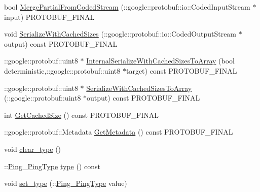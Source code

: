 \begin{DoxyCompactItemize}
\item 
bool \hyperlink{class_ping_acd787a5f6a08da73732ab836a45a6e37}{Merge\+Partial\+From\+Coded\+Stream} (\+::google\+::protobuf\+::io\+::\+Coded\+Input\+Stream $\ast$input) P\+R\+O\+T\+O\+B\+U\+F\+\_\+\+F\+I\+N\+AL
\item 
void \hyperlink{class_ping_a17ce4500b68684b5559d64582f85ac83}{Serialize\+With\+Cached\+Sizes} (\+::google\+::protobuf\+::io\+::\+Coded\+Output\+Stream $\ast$output) const P\+R\+O\+T\+O\+B\+U\+F\+\_\+\+F\+I\+N\+AL
\item 
\+::google\+::protobuf\+::uint8 $\ast$ \hyperlink{class_ping_afaaa02e1530f7932d9dde670d91522a0}{Internal\+Serialize\+With\+Cached\+Sizes\+To\+Array} (bool deterministic,\+::google\+::protobuf\+::uint8 $\ast$target) const P\+R\+O\+T\+O\+B\+U\+F\+\_\+\+F\+I\+N\+AL
\item 
\+::google\+::protobuf\+::uint8 $\ast$ \hyperlink{class_ping_acc6a8786d5c49bd6b7bee07576eb3221}{Serialize\+With\+Cached\+Sizes\+To\+Array} (\+::google\+::protobuf\+::uint8 $\ast$output) const P\+R\+O\+T\+O\+B\+U\+F\+\_\+\+F\+I\+N\+AL
\item 
int \hyperlink{class_ping_ad03f141e652e948c624e7cbddad2a192}{Get\+Cached\+Size} () const P\+R\+O\+T\+O\+B\+U\+F\+\_\+\+F\+I\+N\+AL
\item 
\+::google\+::protobuf\+::\+Metadata \hyperlink{class_ping_a36cbd90f664fba2f065c1ef35b03a8b4}{Get\+Metadata} () const P\+R\+O\+T\+O\+B\+U\+F\+\_\+\+F\+I\+N\+AL
\item 
void \hyperlink{class_ping_ae35e7f5fd2dbbb37fadf914c3494c4d5}{clear\+\_\+type} ()
\item 
\+::\hyperlink{ping_8pb_8h_a4b13f38feb620891e72b30e36aaaf35b}{Ping\+\_\+\+Ping\+Type} \hyperlink{class_ping_a4a48f6fbbf93a25c784d707ccfea6aba}{type} () const 
\item 
void \hyperlink{class_ping_a958fe39d58bc6d1a32ce718f6d43f67d}{set\+\_\+type} (\+::\hyperlink{ping_8pb_8h_a4b13f38feb620891e72b30e36aaaf35b}{Ping\+\_\+\+Ping\+Type} value)
\end{DoxyCompactItemize}
